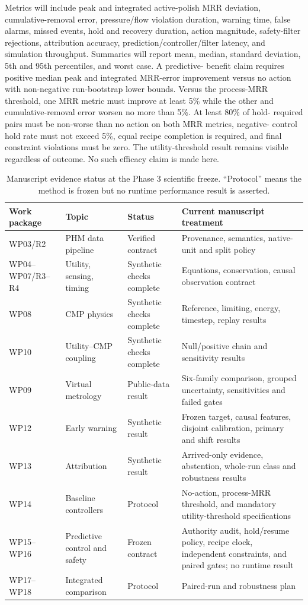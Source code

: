 \documentclass[10pt,twocolumn]{article}
\begin{document}
Metrics will include peak and integrated active-polish MRR deviation,
cumulative-removal error, pressure/flow violation duration, warning time,
false alarms, missed events, hold and recovery duration, action magnitude,
safety-filter rejections, attribution accuracy, prediction/controller/filter
latency, and simulation throughput. Summaries will report mean, median,
standard deviation, 5th and 95th percentiles, and worst case. A predictive-
benefit claim requires positive median peak and integrated MRR-error improvement
versus no action with non-negative run-bootstrap lower bounds. Versus the
process-MRR threshold, one MRR metric must improve at least 5\% while the other
and cumulative-removal error worsen no more than 5\%. At least 80\% of hold-
required pairs must be non-worse than no action on both MRR metrics, negative-
control hold rate must not exceed 5\%, equal recipe completion is required, and
final constraint violations must be zero. The utility-threshold result remains
visible regardless of outcome. No such efficacy claim is made here.

\begin{table}[t]
\centering
\caption{Manuscript evidence status at the Phase 3 scientific freeze.
``Protocol'' means the method is frozen but no runtime performance result is
asserted.}
\label{tab:status}
\small
\begin{tabular}{p{}p{}p{}p{}}
\toprule
Work package & Topic & Status & Current manuscript treatment\\
\midrule
WP03/R2 & PHM data pipeline & Verified contract & Provenance, semantics, native-unit and split policy\\
WP04--WP07/R3--R4 & Utility, sensing, timing & Synthetic checks complete & Equations, conservation, causal observation contract\\
WP08 & CMP physics & Synthetic checks complete & Reference, limiting, energy, timestep, replay results\\
WP10 & Utility--CMP coupling & Synthetic checks complete & Null/positive chain and sensitivity results\\
WP09 & Virtual metrology & Public-data result & Six-family comparison, grouped uncertainty, sensitivities and failed gates\\
WP12 & Early warning & Synthetic result & Frozen target, causal features,
disjoint calibration, primary and shift results\\
WP13 & Attribution & Synthetic result & Arrived-only evidence, abstention,
whole-run class and robustness results\\
WP14 & Baseline controllers & Protocol & No-action, process-MRR threshold, and mandatory utility-threshold specifications\\
WP15--WP16 & Predictive control and safety & Frozen contract & Authority audit, hold/resume policy, recipe clock, independent constraints, and paired gates; no runtime result\\
WP17--WP18 & Integrated comparison & Protocol & Paired-run and robustness plan\\
\bottomrule
\end{tabular}
\end{table}
\end{document}
